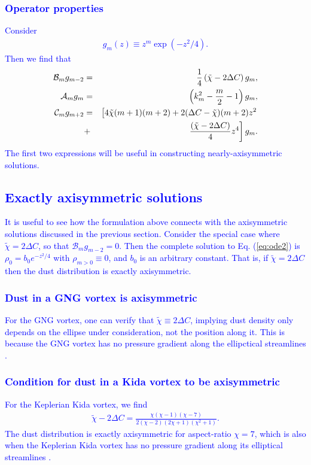 \documentclass[apj]{emulateapj}
\def\blue#1{\textcolor{blue}{#1}}
\newcommand{\Eq}[1]{Eq. (\ref{#1})}
\newcommand{\eq}[1]{\Eq{#1}}
\newcommand{\beqn}{\begin{eqnarray}}
\newcommand{\eeqn}{\end{eqnarray}}
\begin{document}
\blue{
\subsubsection{Operator properties}
Consider 
\begin{align}
	g_m(z) \equiv z^m\exp{(-z^2/4)}.
\end{align}
Then we find that 
\beqn
\mathcal{B}_mg_{m-2} &=&\frac{1}{4}\left(\tilde{\chi} - 2\Delta C\right)g_m,\\
\mathcal{A}_mg_m &=& \left(k_m^2 - \frac{m}{2} - 1\right)g_m,\\
\mathcal{C}_mg_{m+2}&=& \left[4\tilde{\chi}(m+1)(m+2) +2(\Delta C-\tilde{\chi})(m+2)z^2 \right.
\notag\\ &+&\left. \frac{\left(\tilde{\chi} - 2\Delta C\right)}{4}z^4\right]g_m. 
\eeqn
The first two expressions will be useful in constructing nearly-axisymmetric solutions. 
}
\blue{
\subsection{Exactly axisymmetric solutions}
It is useful to see how the formulation above connects with the  axisymmetric solutions discussed in the previous section.  Consider the special case where $\tilde{\chi} = 2\Delta C$, so that 
$\mathcal{B}_mg_{m-2} = 0.$
Then the complete solution to \eq{eq:ode2} is $\rho_0 = b_0e^{-z^2/4}$ with $\rho_{m>0} \equiv 0$, and $b_0$ is an arbitrary constant. That is, if $\tilde{\chi}=2\Delta C$ then the dust distribution is exactly axisymmetric. 
}
\blue{
\subsubsection{Dust in a GNG vortex is axisymmetric}
For the GNG vortex, one can verify that $\tilde{\chi}\equiv 2\Delta C$, implying dust density only depends on the ellipse under consideration, not the position along it. This is because the GNG vortex has no pressure gradient along the ellipctical streamlines \citep{Chang-Oishi10}. 
}
\blue{
\subsubsection{Condition for dust in a Kida vortex to be axisymmetric}
For the Keplerian Kida vortex, we find
\begin{align}
\tilde{\chi} - 2\Delta C = \frac{\chi(\chi-1)(\chi-7)}{2(\chi-2)(2\chi+1)(\chi^2+1)}.
\end{align}
The dust distribution is exactly axisymmetric for aspect-ratio $\chi=7$, which is also when the Keplerian Kida vortex has no pressure gradient along its elliptical streamlines \citep{Chang-Oishi10}. 
}
\end{document}
